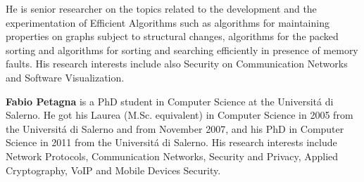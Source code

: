 \documentclass[authoryear]{elsarticle}
\begin{document}
He is senior researcher on the topics related to the development and
the experimentation of Efficient Algorithms such as algorithms for
maintaining properties on graphs subject to structural changes,
algorithms for the packed sorting and algorithms for sorting and
searching efficiently in presence of memory faults.  His research
interests include also Security on Communication Networks and Software
Visualization.

\medskip

\textbf{Fabio Petagna} is a PhD student in Computer Science at the Universit\'{a} di Salerno. He got his Laurea
(M.Sc. equivalent) in Computer Science in 2005 from the Universit\'{a} di Salerno and from November 2007, and his PhD in Computer Science in 2011 from the Universit\'{a} di Salerno. His research interests include Network Protocols, Communication Networks, Security and Privacy, Applied Cryptography, VoIP and Mobile Devices Security.
\end{document}
